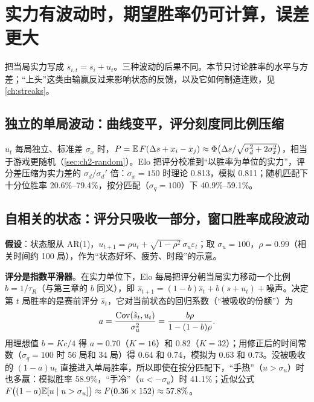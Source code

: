 \section{实力有波动时，期望胜率仍可计算，误差更大}
\label{sec:ch2-fluct}

把当局实力写成 $s_{i,t}=s_i+u_t$。三种波动的后果不同。本节只讨论胜率的水平与方差；“上头”这类由输赢反过来影响状态的反馈，以及它如何制造连败，见\cref{ch:streaks}。

\subsection{独立的单局波动：曲线变平，评分刻度同比例压缩}

$u_t$ 每局独立、标准差 $\sigma_x$ 时，$P=\mathbb{E}\,F(\Delta s+x_i-x_j)\approx\Phi\bigl(\Delta s/\sqrt{\sigma_d^2+2\sigma_x^2}\bigr)$，相当于游戏更随机（\cref{sec:ch2-random}）。Elo 把评分校准到“以胜率为单位的实力”，评分差压缩为实力差的 $\sigma_d/\sigma_d'$ 倍：$\sigma_x=150$ 时理论 0.813，模拟 0.811；随机匹配下十分位胜率 20.6\%–79.4\%，按分匹配（$\sigma_q=100$）下 40.9\%–59.1\%\tagOwn。

\subsection{自相关的状态：评分只吸收一部分，窗口胜率成段波动}
\label{sec:ch2-ar1}

\textbf{假设}：状态服从 AR(1)，$u_{t+1}=\rho u_t+\sqrt{1-\rho^2}\,\sigma_u\varepsilon_t$；取 $\sigma_u=100$，$\rho=0.99$（相关时间约 100 局），作为“状态好坏、疲劳、时段”的示意。

\textbf{评分是指数平滑器}。在实力单位下，Elo 每局把评分朝当局实力移动一个比例 $b=1/\tau_R$（与第三章的 $b$ 同义），即 $\hat s_{t+1}=(1-b)\hat s_t+b(s+u_t)+\text{噪声}$。决定第 $t$ 局胜率的是赛前评分 $\hat s_t$，它对当前状态的回归系数（“被吸收的份额”）为
\begin{equation}
  a=\frac{\operatorname{Cov}(\hat s_t,u_t)}{\sigma_u^2}=\frac{b\rho}{1-(1-b)\rho}.
  \label{eq:ch2-absorb}
\end{equation}
用理想值 $b=Kc/4$ 得 $a=0.70$（$K=16$）和 0.82（$K=32$）；用修正后的时间常数（$\sigma_q=100$ 时 56 局和 34 局）得 0.64 和 0.74，模拟为 0.63 和 0.73\tagOwn。没被吸收的 $(1-a)u_t$ 直接进入单局胜率，所以即使在按分匹配下，“手热”（$u>\sigma_u$）时也多赢：模拟胜率 58.9\%，“手冷”（$u<-\sigma_u$）时 41.1\%；近似公式 $F\bigl((1-a)\mathbb{E}[u\mid u>\sigma_u]\bigr)\approx F(0.36\times152)\approx57.8\%$\tagOwn。

